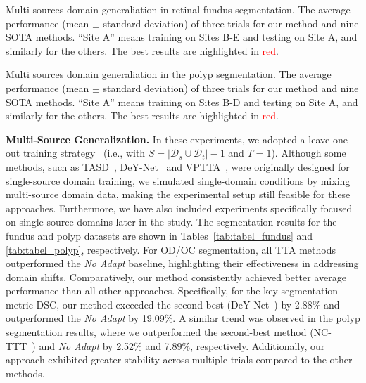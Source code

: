 \begin{table}[h!]
\centering
  \caption{Multi sources domain generaliation in retinal fundus segmentation. The average performance (mean $\pm$ standard deviation) of three trials for our method and nine SOTA methods. ``Site A'' means training on Sites B-E and testing on Site A, and similarly for the others. The best results are highlighted in \textcolor{red}{red}.}
  \vspace{-5pt}
  \begin{adjustbox}{width=0.99\linewidth}
    
  \end{adjustbox}
  \label{tab:tabel_fundus}
\end{table}

\begin{table}[h!]
\centering
  \caption{Multi sources domain generaliation in the polyp segmentation. The average performance (mean $\pm$ standard deviation) of three trials for our method and nine SOTA methods. ``Site A'' means training on Sites B-D and testing on Site A, and similarly for the others. The best results are highlighted in \textcolor{red}{red}.}
  \vspace{-9pt}
  \begin{adjustbox}{width=0.99\linewidth}
    
  \end{adjustbox}
  \label{tab:tabel_polyp}
\end{table}

\noindent \textbf{Multi-Source Generalization.} In these experiments, we adopted a leave-one-out training strategy~\cite{chen2023improved} (i.e., with $S = |\mathcal{D}_s \cup \mathcal{D}_t|-1$ and $T = 1$). Although some methods, such as TASD~\cite{liu2022single}, DeY-Net~\cite{wen2024denoising} and VPTTA~\cite{chen2024each}, were originally designed for single-source domain training, we simulated single-domain conditions by mixing multi-source domain data, making the experimental setup still feasible for these approaches. Furthermore, we have also included experiments specifically focused on single-source domains later in the study. The segmentation results for the fundus and polyp datasets are shown in Tables~\ref{tab:tabel_fundus} and \ref{tab:tabel_polyp}, respectively. For OD/OC segmentation, all TTA methods outperformed the \textit{No Adapt} baseline, highlighting their effectiveness in addressing domain shifts. Comparatively, our method consistently achieved better average performance than all other approaches. Specifically, for the key segmentation metric DSC, our method exceeded the second-best (DeY-Net~\cite{wen2024denoising}) by 2.88\% and outperformed the \textit{No Adapt} by 19.09\%. A similar trend was observed in the polyp segmentation results, where we outperformed the second-best method (NC-TTT~\cite{osowiechi2024nc}) and \textit{No Adapt} by 2.52\% and 7.89\%, respectively. Additionally, our approach exhibited greater stability across multiple trials compared to the other methods.

